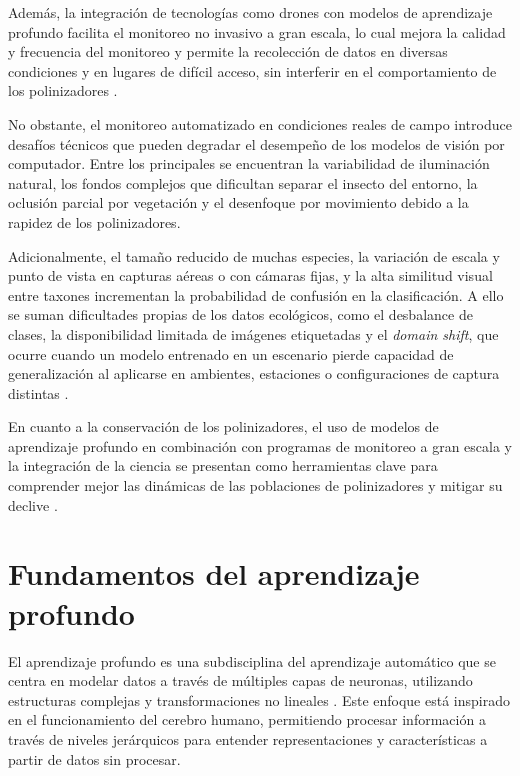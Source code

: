 Además, la integración de tecnologías como drones con modelos de aprendizaje
profundo facilita el monitoreo no invasivo a gran escala, lo cual mejora la calidad y frecuencia del monitoreo y permite la recolección de datos en diversas condiciones y en lugares de difícil acceso, sin interferir en el comportamiento de los polinizadores \parencite{kim2025drone}.

No obstante, el monitoreo automatizado en condiciones reales de campo introduce desafíos técnicos que pueden degradar el desempeño de los modelos de visión por computador. Entre los principales se encuentran la variabilidad de iluminación natural, los fondos complejos que dificultan separar el insecto del entorno, la oclusión parcial por vegetación y el desenfoque por movimiento debido a la rapidez de los polinizadores. 

Adicionalmente, el tamaño reducido de muchas especies, la variación de escala y punto de vista en capturas aéreas o con cámaras fijas, y la alta similitud visual entre taxones incrementan la probabilidad de confusión en la clasificación. A ello se suman dificultades propias de los datos ecológicos, como el desbalance de clases, la disponibilidad limitada de imágenes etiquetadas y el \textit{domain shift}, que ocurre cuando un modelo entrenado en un escenario pierde capacidad de generalización al aplicarse en ambientes, estaciones o configuraciones de captura distintas \parencite{stefan2025successes}.

En cuanto a la conservación de los polinizadores, el uso de modelos de aprendizaje profundo en combinación con programas de monitoreo a gran escala y la integración de la ciencia se presentan como herramientas clave para comprender mejor las dinámicas de las poblaciones de polinizadores y mitigar su declive \parencite{hellwig2024pollinator}. 

\section{Fundamentos del aprendizaje profundo }

El aprendizaje profundo es una subdisciplina del aprendizaje automático que se centra en modelar datos a través de múltiples capas de neuronas, utilizando estructuras complejas y transformaciones no lineales \parencite{bhargavi2020survey}. Este enfoque está inspirado en el funcionamiento del cerebro humano, permitiendo procesar información a través de niveles jerárquicos para entender representaciones y características a partir de datos sin procesar.

